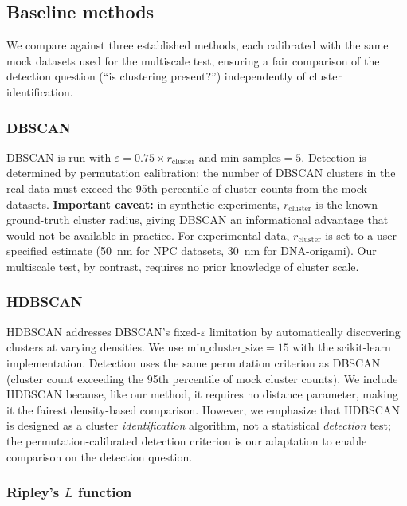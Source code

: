 \documentclass[11pt]{article}
\begin{document}
\subsection{Baseline methods}
\label{sec:baselines}

We compare against three established methods, each calibrated with the
same mock datasets used for the multiscale test, ensuring a fair
comparison of the detection question (``is clustering present?'')
independently of cluster identification.

\subsubsection{DBSCAN}

DBSCAN \citep{ester1996} is run with $\varepsilon = 0.75 \times
r_\mathrm{cluster}$ and $\mathrm{min\_samples} = 5$. Detection is
determined by permutation calibration: the number of DBSCAN clusters in
the real data must exceed the 95th percentile of cluster counts from the
mock datasets. \textbf{Important caveat:} in synthetic experiments,
$r_\mathrm{cluster}$ is the known ground-truth cluster radius, giving
DBSCAN an informational advantage that would not be available in practice.
For experimental data, $r_\mathrm{cluster}$ is set to a user-specified
estimate (50~nm for NPC datasets, 30~nm for DNA-origami). Our multiscale
test, by contrast, requires no prior knowledge of cluster scale.

\subsubsection{HDBSCAN}

HDBSCAN addresses DBSCAN's fixed-$\varepsilon$ limitation by
automatically discovering clusters at varying densities. We use
$\mathrm{min\_cluster\_size} = 15$ with the scikit-learn implementation.
Detection uses the same permutation criterion as DBSCAN (cluster count
exceeding the 95th percentile of mock cluster counts). We include
HDBSCAN because, like our method, it requires no distance parameter,
making it the fairest density-based comparison. However, we emphasize
that HDBSCAN is designed as a cluster \emph{identification} algorithm,
not a statistical \emph{detection} test; the permutation-calibrated
detection criterion is our adaptation to enable comparison on the
detection question.

\subsubsection{Ripley's $L$ function}
\end{document}
